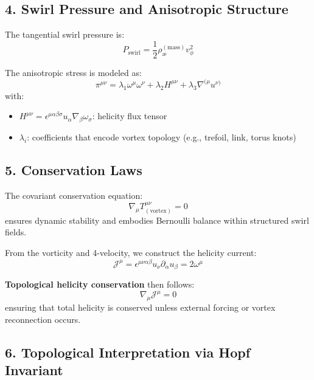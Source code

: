 \documentclass[twocolumn,aps,pre,floatfix,nofootinbib]{revtex4-2}
\begin{document}
    \subsection*{4. Swirl Pressure and Anisotropic Structure}

    The tangential swirl pressure is:
    \begin{equation}
        P_{\text{swirl}} = \frac{1}{2} \rho_{\text{\ae}}^{(\text{mass})} v_\phi^2
    \end{equation}

    The anisotropic stress is modeled as:
    \begin{equation}
        \pi^{\mu\nu} = \lambda_1 \omega^\mu \omega^\nu + \lambda_2 H^{\mu\nu} + \lambda_3 \nabla^{(\mu} u^{\nu)}
    \end{equation}
    with:
    \begin{itemize}
        \item \( H^{\mu\nu} = \epsilon^{\mu\alpha\beta\sigma} u_\alpha \nabla_\beta \omega_\sigma \): helicity flux tensor
        \item \( \lambda_i \): coefficients that encode vortex topology (e.g., trefoil, link, torus knots)
    \end{itemize}

    \subsection*{5. Conservation Laws}

    The covariant conservation equation:
    \begin{equation}
        \nabla_\mu T^{\mu\nu}_{(\text{vortex})} = 0
    \end{equation}
    ensures dynamic stability and embodies Bernoulli balance within structured swirl fields.

    From the vorticity and 4-velocity, we construct the helicity current:
    \begin{equation}
        \mathcal{J}^\mu = \epsilon^{\mu\nu\alpha\beta} u_\nu \partial_\alpha u_\beta = 2 \omega^\mu
    \end{equation}

    \textbf{Topological helicity conservation} then follows:
    \begin{equation}
        \nabla_\mu \mathcal{J}^\mu = 0
    \end{equation}
    ensuring that total helicity is conserved unless external forcing or vortex reconnection occurs.

    \subsection*{6. Topological Interpretation via Hopf Invariant}
\end{document}
